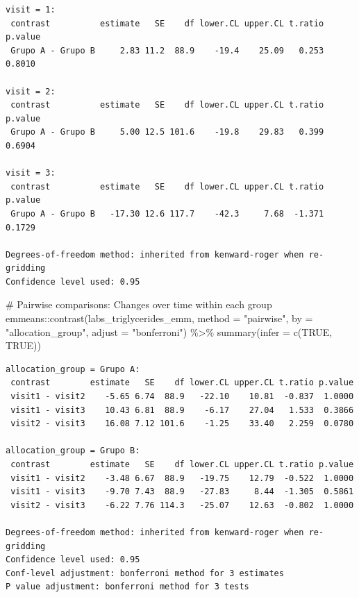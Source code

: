 \documentclass[
  12pt,
]{article}
\newenvironment{Shaded}{\begin{snugshade}}{\end{snugshade}}
\newcommand{\AttributeTok}[1]{\textcolor[rgb]{0.40,0.45,0.13}{#1}}
\newcommand{\CommentTok}[1]{\textcolor[rgb]{0.37,0.37,0.37}{#1}}
\newcommand{\ConstantTok}[1]{\textcolor[rgb]{0.56,0.35,0.01}{#1}}
\newcommand{\FunctionTok}[1]{\textcolor[rgb]{0.28,0.35,0.67}{#1}}
\newcommand{\NormalTok}[1]{\textcolor[rgb]{0.00,0.23,0.31}{#1}}
\newcommand{\SpecialCharTok}[1]{\textcolor[rgb]{0.37,0.37,0.37}{#1}}
\newcommand{\StringTok}[1]{\textcolor[rgb]{0.13,0.47,0.30}{#1}}
\begin{document}
\begin{verbatim}
visit = 1:
 contrast          estimate   SE    df lower.CL upper.CL t.ratio p.value
 Grupo A - Grupo B     2.83 11.2  88.9    -19.4    25.09   0.253  0.8010

visit = 2:
 contrast          estimate   SE    df lower.CL upper.CL t.ratio p.value
 Grupo A - Grupo B     5.00 12.5 101.6    -19.8    29.83   0.399  0.6904

visit = 3:
 contrast          estimate   SE    df lower.CL upper.CL t.ratio p.value
 Grupo A - Grupo B   -17.30 12.6 117.7    -42.3     7.68  -1.371  0.1729

Degrees-of-freedom method: inherited from kenward-roger when re-gridding 
Confidence level used: 0.95 
\end{verbatim}

\begin{Shaded}
\begin{Highlighting}[]
\CommentTok{\# Pairwise comparisons: Changes over time within each group}
\NormalTok{emmeans}\SpecialCharTok{::}\FunctionTok{contrast}\NormalTok{(labs\_triglycerides\_emm,}
\AttributeTok{method =} \StringTok{"pairwise"}\NormalTok{, }\AttributeTok{by =} \StringTok{"allocation\_group"}\NormalTok{,}
\AttributeTok{adjust =} \StringTok{"bonferroni"}\NormalTok{) }\SpecialCharTok{\%\textgreater{}\%} \FunctionTok{summary}\NormalTok{(}\AttributeTok{infer =} \FunctionTok{c}\NormalTok{(}\ConstantTok{TRUE}\NormalTok{, }\ConstantTok{TRUE}\NormalTok{))}
\end{Highlighting}
\end{Shaded}

\begin{verbatim}
allocation_group = Grupo A:
 contrast        estimate   SE    df lower.CL upper.CL t.ratio p.value
 visit1 - visit2    -5.65 6.74  88.9   -22.10    10.81  -0.837  1.0000
 visit1 - visit3    10.43 6.81  88.9    -6.17    27.04   1.533  0.3866
 visit2 - visit3    16.08 7.12 101.6    -1.25    33.40   2.259  0.0780

allocation_group = Grupo B:
 contrast        estimate   SE    df lower.CL upper.CL t.ratio p.value
 visit1 - visit2    -3.48 6.67  88.9   -19.75    12.79  -0.522  1.0000
 visit1 - visit3    -9.70 7.43  88.9   -27.83     8.44  -1.305  0.5861
 visit2 - visit3    -6.22 7.76 114.3   -25.07    12.63  -0.802  1.0000

Degrees-of-freedom method: inherited from kenward-roger when re-gridding 
Confidence level used: 0.95 
Conf-level adjustment: bonferroni method for 3 estimates 
P value adjustment: bonferroni method for 3 tests 
\end{verbatim}
\end{document}
